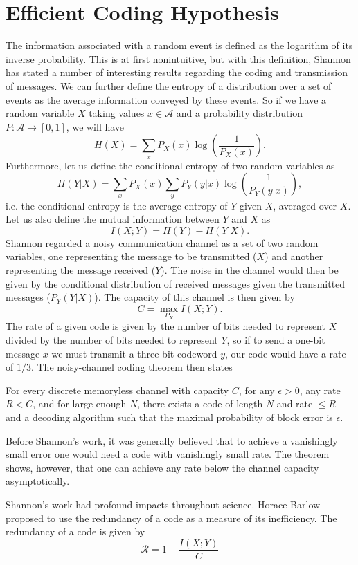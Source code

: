\section{Efficient Coding Hypothesis}

The information associated with a random event is defined as the logarithm of its inverse probability. This is at first nonintuitive, but with this definition, Shannon \cite{Shannon1948} has stated a number of interesting results regarding the coding and transmission of messages. We can further define the entropy of a distribution over a set of events as the average information conveyed by these events. So if we have a random variable $X$ taking values $x \in \mathcal{A}$ and a probability distribution $P : \mathcal{A} \to [0,1]$, we will have
$$
H(X)= \sum_x P_X(x) \log\left(\frac{1}{P_X(x)}\right).
$$
Furthermore, let us define the conditional entropy of two random variables as
$$
H(Y|X) = \sum_x P_X(x) \sum_y P_Y(y|x) \log\left(\frac{1}{P_Y(y|x)}\right),
$$
i.e. the conditional entropy is the average entropy of $Y$ given $X$, averaged over $X$. Let us also define the mutual information between $Y$ and $X$ as
$$
I(X;Y) = H(Y) - H(Y|X).
$$
Shannon regarded a noisy communication channel as a set of two random variables, one representing the message to be transmitted ($X$) and another representing the message received ($Y$). The noise in the channel would then be given by the conditional distribution of received messages given the transmitted messages ($P_Y(Y|X)$). The capacity of this channel is then given by
$$
C = \max_{P_X} I(X;Y).
$$
The rate of a given code is given by the number of bits needed to represent $X$ divided by the number of bits needed to represent $Y$, so if to send a one-bit message $x$ we must transmit a three-bit codeword $y$, our code would have a rate of $1/3$.
The noisy-channel coding theorem\cite{mackay2003information} then states
\begin{noisychannel}
For every discrete memoryless channel with capacity $C$, for any $\epsilon>0$, any rate $R<C$, and for large enough $N$, there exists a code of length $N$ and rate $\leq R$ and a decoding algorithm such that the maximal probability of block error is $\epsilon$.
\end{noisychannel}
Before Shannon's work, it was generally believed that to achieve a vanishingly small error one would need a code with vanishingly small rate. The theorem shows, however, that one can achieve any rate below the channel capacity asymptotically.\par
Shannon's work had profound impacts throughout science. Horace Barlow proposed to use the redundancy of a code as a measure of its inefficiency. The redundancy of a code is given by
$$
\mathcal{R} = 1 - \frac{I(X;Y)}{C}
$$


